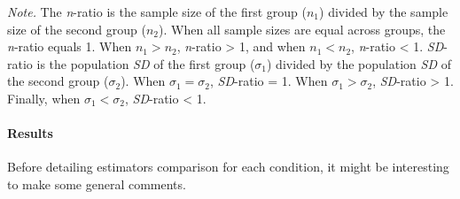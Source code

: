 \documentclass[
  man,floatsintext]{apa6}
\begin{document}
\emph{Note.} The \emph{n}-ratio is the sample size of the first group (\(n_1\)) divided by the sample size of the second group (\(n_2\)). When all sample sizes are equal across groups, the \emph{n}-ratio equals 1. When \(n_1 > n_2\), \emph{n}-ratio \textgreater{} 1, and when \(n_1 < n_2\), \emph{n}-ratio \textless{} 1. \emph{SD}-ratio is the population \emph{SD} of the first group (\(\sigma_1\)) divided by the population \emph{SD} of the second group (\(\sigma_2\)). When \(\sigma_1=\sigma_2\), \emph{SD}-ratio = 1. When \(\sigma_1>\sigma_2\), \emph{SD}-ratio \textgreater{} 1. Finally, when \(\sigma_1<\sigma_2\), \emph{SD}-ratio \textless{} 1.

\hypertarget{results}{%
\paragraph{Results}\label{results}}

Before detailing estimators comparison for each condition, it might be interesting to make some general comments.
\end{document}

